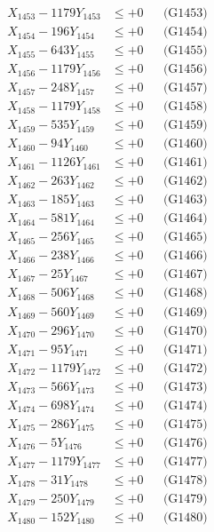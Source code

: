 \documentclass[a4paper,10pt]{article}
\begin{document}
{\begin{align}
X_{1453} - 1179Y_{1453} &\leq +0 && \text{(G1453)} \\
X_{1454} - 196Y_{1454} &\leq +0 && \text{(G1454)} \\
X_{1455} - 643Y_{1455} &\leq +0 && \text{(G1455)} \\
X_{1456} - 1179Y_{1456} &\leq +0 && \text{(G1456)} \\
X_{1457} - 248Y_{1457} &\leq +0 && \text{(G1457)} \\
X_{1458} - 1179Y_{1458} &\leq +0 && \text{(G1458)} \\
X_{1459} - 535Y_{1459} &\leq +0 && \text{(G1459)} \\
X_{1460} - 94Y_{1460} &\leq +0 && \text{(G1460)} \\
\allowbreak
X_{1461} - 1126Y_{1461} &\leq +0 && \text{(G1461)} \\
X_{1462} - 263Y_{1462} &\leq +0 && \text{(G1462)} \\
X_{1463} - 185Y_{1463} &\leq +0 && \text{(G1463)} \\
X_{1464} - 581Y_{1464} &\leq +0 && \text{(G1464)} \\
X_{1465} - 256Y_{1465} &\leq +0 && \text{(G1465)} \\
X_{1466} - 238Y_{1466} &\leq +0 && \text{(G1466)} \\
X_{1467} - 25Y_{1467} &\leq +0 && \text{(G1467)} \\
X_{1468} - 506Y_{1468} &\leq +0 && \text{(G1468)} \\
X_{1469} - 560Y_{1469} &\leq +0 && \text{(G1469)} \\
X_{1470} - 296Y_{1470} &\leq +0 && \text{(G1470)} \\
\allowbreak
X_{1471} - 95Y_{1471} &\leq +0 && \text{(G1471)} \\
X_{1472} - 1179Y_{1472} &\leq +0 && \text{(G1472)} \\
X_{1473} - 566Y_{1473} &\leq +0 && \text{(G1473)} \\
X_{1474} - 698Y_{1474} &\leq +0 && \text{(G1474)} \\
X_{1475} - 286Y_{1475} &\leq +0 && \text{(G1475)} \\
X_{1476} - 5Y_{1476} &\leq +0 && \text{(G1476)} \\
X_{1477} - 1179Y_{1477} &\leq +0 && \text{(G1477)} \\
X_{1478} - 31Y_{1478} &\leq +0 && \text{(G1478)} \\
X_{1479} - 250Y_{1479} &\leq +0 && \text{(G1479)} \\
X_{1480} - 152Y_{1480} &\leq +0 && \text{(G1480)} \\

\end{align}}
\end{document}
